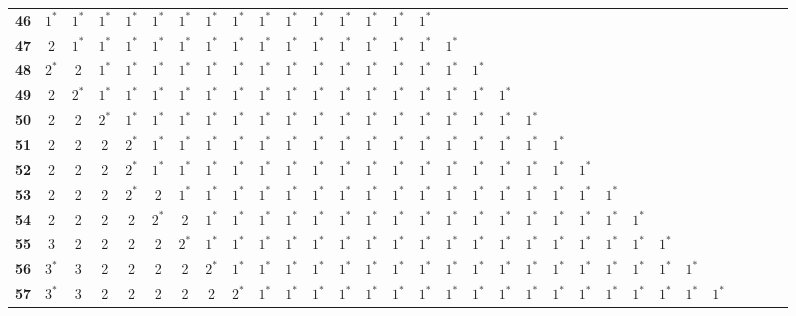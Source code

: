 \begin{landscape}
{\begin{table}
\begin{tabular}{|c| c c c c c c c c c c c c c c c c c c c c c c c c c c c c c c |}
\textbf{46} & $1^*$ & $1^*$ & $1^*$ & $1^*$ & $1^*$ & $1^*$ & $1^*$ & $1^*$ & $1^*$ & $1^*$ & $1^*$ & $1^*$ & $1^*$ & $1^*$ & $1^*$ & & & & & & & & & & & & & & & \\
\textbf{47} & 2 & $1^*$ & $1^*$ & $1^*$ & $1^*$ & $1^*$ & $1^*$ & $1^*$ & $1^*$ & $1^*$ & $1^*$ & $1^*$ & $1^*$ & $1^*$ & $1^*$ & $1^*$ & & & & & & & & & & & & & & \\
\textbf{48} & $2^*$ & 2 & $1^*$ & $1^*$ & $1^*$ & $1^*$ & $1^*$ & $1^*$ & $1^*$ & $1^*$ & $1^*$ & $1^*$ & $1^*$ & $1^*$ & $1^*$ & $1^*$ & $1^*$ & & & & & & & & & & & & & \\
\textbf{49} & 2 & $2^*$ & $1^*$ & $1^*$ & $1^*$ & $1^*$ & $1^*$ & $1^*$ & $1^*$ & $1^*$ & $1^*$ & $1^*$ & $1^*$ & $1^*$ & $1^*$ & $1^*$ & $1^*$ & $1^*$ & & & & & & & & & & & & \\
\textbf{50} & 2 & 2 & $2^*$ & $1^*$ & $1^*$ & $1^*$ & $1^*$ & $1^*$ & $1^*$ & $1^*$ & $1^*$ & $1^*$ & $1^*$ & $1^*$ & $1^*$ & $1^*$ & $1^*$ & $1^*$ & $1^*$ & & & & & & & & & & & \\
\textbf{51} & 2 & 2 & 2 & $2^*$ & $1^*$ & $1^*$ & $1^*$ & $1^*$ & $1^*$ & $1^*$ & $1^*$ & $1^*$ & $1^*$ & $1^*$ & $1^*$ & $1^*$ & $1^*$ & $1^*$ & $1^*$ & $1^*$ & & & & & & & & & & \\
\textbf{52} & 2 & 2 & 2 & $2^*$ & $1^*$ & $1^*$ & $1^*$ & $1^*$ & $1^*$ & $1^*$ & $1^*$ & $1^*$ & $1^*$ & $1^*$ & $1^*$ & $1^*$ & $1^*$ & $1^*$ & $1^*$ & $1^*$ & $1^*$ & & & & & & & & & \\
\textbf{53} & 2 & 2 & 2 & $2^*$ & 2 & $1^*$ & $1^*$ & $1^*$ & $1^*$ & $1^*$ & $1^*$ & $1^*$ & $1^*$ & $1^*$ & $1^*$ & $1^*$ & $1^*$ & $1^*$ & $1^*$ & $1^*$ & $1^*$ & $1^*$ & & & & & & & & \\
\textbf{54} & 2 & 2 & 2 & 2 & $2^*$ & 2 & $1^*$ & $1^*$ & $1^*$ & $1^*$ & $1^*$ & $1^*$ & $1^*$ & $1^*$ & $1^*$ & $1^*$ & $1^*$ & $1^*$ & $1^*$ & $1^*$ & $1^*$ & $1^*$ & $1^*$ & & & & & & & \\
\textbf{55} & 3 & 2 & 2 & 2 & 2 & $2^*$ & $1^*$ & $1^*$ & $1^*$ & $1^*$ & $1^*$ & $1^*$ & $1^*$ & $1^*$ & $1^*$ & $1^*$ & $1^*$ & $1^*$ & $1^*$ & $1^*$ & $1^*$ & $1^*$ & $1^*$ & $1^*$ & & & & & & \\
\textbf{56} & $3^*$ & 3 & 2 & 2 & 2 & 2 & $2^*$ & $1^*$ & $1^*$ & $1^*$ & $1^*$ & $1^*$ & $1^*$ & $1^*$ & $1^*$ & $1^*$ & $1^*$ & $1^*$ & $1^*$ & $1^*$ & $1^*$ & $1^*$ & $1^*$ & $1^*$ & $1^*$ & & & & & \\
\textbf{57} & $3^*$ & 3 & 2 & 2 & 2 & 2 & 2 & $2^*$ & $1^*$ & $1^*$ & $1^*$ & $1^*$ & $1^*$ & $1^*$ & $1^*$ & $1^*$ & $1^*$ & $1^*$ & $1^*$ & $1^*$ & $1^*$ & $1^*$ & $1^*$ & $1^*$ & $1^*$ & $1^*$ & & & & \\

\end{tabular}
\end{table}}
\end{landscape}

